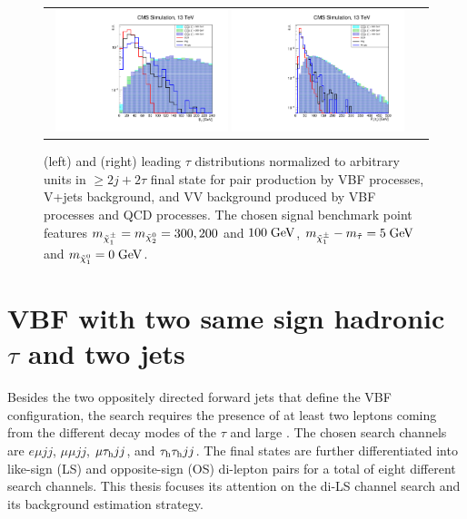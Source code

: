 \begin{figure}[tbh!]
	\centering
	\begin{tabular}{cc}
		\includegraphics[width=0.48\textwidth]{analysis/pics/h_met_prospects13tev.pdf}
		\includegraphics[width=0.48\textwidth]{analysis/pics/h_tau1pt_prospects13tev.pdf} 		
	\end{tabular}
	\caption{(left) \met and (right) leading \ensuremath{\tau} \pt distributions normalized to arbitrary units in \ensuremath{\geq 2j + 2\tau} final state for \charginopm \charginopm pair production by VBF processes, V+jets background, and VV background produced by VBF processes and QCD processes. The chosen signal benchmark point features \ensuremath{m_{\charginopm} = m_{\neutralinotwo} =300, 200} and \ensuremath{100\gev}, \ensuremath{m_{\charginopm} - m_{\tilde{\tau}} = 5\gev} and \ensuremath{m_{\neutralinoone} = 0\gev}.}
	\label{fig:VBF_met_pttau}
\end{figure}


\section{VBF with two same sign hadronic $\tau$ and two jets}

Besides the two oppositely directed forward jets that define the VBF configuration, the search requires the presence of at least two leptons coming from the different decay modes of the $\tau$ and large \met. The chosen search channels are $e\mu jj$, $\mu\mu jj$, $\mu\tau_{\text{h}} jj$, and $\tau_{\text{h}}\tau_{\text{h}} jj$. The final states are further differentiated into like-sign (LS) and opposite-sign (OS) di-lepton pairs for a total of eight different search channels. This thesis focuses its attention on the di-\hadtau LS channel search and its background estimation strategy. 


